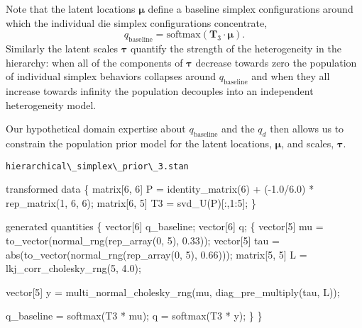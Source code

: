 \documentclass[
  letterpaper,
  DIV=11,
  numbers=noendperiod]{scrartcl}
\newenvironment{Shaded}{\begin{snugshade}}{\end{snugshade}}
\newcommand{\DataTypeTok}[1]{\textcolor[rgb]{0.68,0.00,0.00}{#1}}
\newcommand{\DecValTok}[1]{\textcolor[rgb]{0.68,0.00,0.00}{#1}}
\newcommand{\FloatTok}[1]{\textcolor[rgb]{0.68,0.00,0.00}{#1}}
\newcommand{\KeywordTok}[1]{\textcolor[rgb]{0.00,0.23,0.31}{#1}}
\newcommand{\NormalTok}[1]{\textcolor[rgb]{0.00,0.23,0.31}{#1}}
\begin{document}
Note that the latent locations \(\boldsymbol{\mu}\) define a baseline
simplex configurations around which the individual die simplex
configurations concentrate, \[
q_{\mathrm{baseline}}
=
\mathrm{softmax}( \mathbf{T}_{3} \cdot \boldsymbol{\mu} ).
\] Similarly the latent scales \(\boldsymbol{\tau}\) quantify the
strength of the heterogeneity in the hierarchy: when all of the
components of \(\boldsymbol{\tau}\) decrease towards zero the population
of individual simplex behaviors collapses around
\(q_{\mathrm{baseline}}\) and when they all increase towards infinity
the population decouples into an independent heterogeneity model.

Our hypothetical domain expertise about \(q_{\mathrm{baseline}}\) and
the \(q_{d}\) then allows us to constrain the population prior model for
the latent locations, \(\boldsymbol{\mu}\), and scales,
\(\boldsymbol{\tau}\).

\begin{codelisting}

\caption{\texttt{hierarchical\textbackslash\_simplex\textbackslash\_prior\textbackslash\_3.stan}}

\begin{Shaded}
\begin{Highlighting}[]
\KeywordTok{transformed data}\NormalTok{ \{}
  \DataTypeTok{matrix}\NormalTok{[}\DecValTok{6}\NormalTok{, }\DecValTok{6}\NormalTok{] P = identity\_matrix(}\DecValTok{6}\NormalTok{) + ({-}}\FloatTok{1.0}\NormalTok{/}\FloatTok{6.0}\NormalTok{) * rep\_matrix(}\DecValTok{1}\NormalTok{, }\DecValTok{6}\NormalTok{, }\DecValTok{6}\NormalTok{);}
  \DataTypeTok{matrix}\NormalTok{[}\DecValTok{6}\NormalTok{, }\DecValTok{5}\NormalTok{] T3 = svd\_U(P)[:,}\DecValTok{1}\NormalTok{:}\DecValTok{5}\NormalTok{];}
\NormalTok{\}}

\KeywordTok{generated quantities}\NormalTok{ \{}
  \DataTypeTok{vector}\NormalTok{[}\DecValTok{6}\NormalTok{] q\_baseline;}
  \DataTypeTok{vector}\NormalTok{[}\DecValTok{6}\NormalTok{] q;}
\NormalTok{  \{}
    \DataTypeTok{vector}\NormalTok{[}\DecValTok{5}\NormalTok{] mu = to\_vector(normal\_rng(rep\_array(}\DecValTok{0}\NormalTok{, }\DecValTok{5}\NormalTok{), }\FloatTok{0.33}\NormalTok{));}
    \DataTypeTok{vector}\NormalTok{[}\DecValTok{5}\NormalTok{] tau = abs(to\_vector(normal\_rng(rep\_array(}\DecValTok{0}\NormalTok{, }\DecValTok{5}\NormalTok{), }\FloatTok{0.66}\NormalTok{)));}
    \DataTypeTok{matrix}\NormalTok{[}\DecValTok{5}\NormalTok{, }\DecValTok{5}\NormalTok{] L = lkj\_corr\_cholesky\_rng(}\DecValTok{5}\NormalTok{, }\FloatTok{4.0}\NormalTok{);}

    \DataTypeTok{vector}\NormalTok{[}\DecValTok{5}\NormalTok{] y = multi\_normal\_cholesky\_rng(mu, diag\_pre\_multiply(tau, L));}

\NormalTok{    q\_baseline = softmax(T3 * mu);}
\NormalTok{    q = softmax(T3 * y);}
\NormalTok{  \}}
\NormalTok{\}}
\end{Highlighting}
\end{Shaded}

\end{codelisting}
\end{document}
